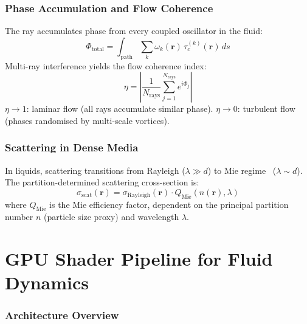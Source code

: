 \documentclass[twocolumn,10pt,a4paper]{article}
\theoremstyle{plain}
\theoremstyle{definition}
\theoremstyle{remark}
\newcommand{\tauc}{\tau_c}
\begin{document}
\section{Phase Accumulation and Flow Coherence}
\label{sec:coherence}

The ray accumulates phase from every coupled oscillator in the fluid:
\begin{equation}
    \Phi_{\mathrm{total}} = \int_{\mathrm{path}} \sum_k \omega_k(\mathbf{r})\, \tauc^{(k)}(\mathbf{r})\, ds
\end{equation}
Multi-ray interference yields the flow coherence index:
\begin{equation}
    \eta = \left|\frac{1}{N_{\mathrm{rays}}} \sum_{j=1}^{N_{\mathrm{rays}}} e^{i\Phi_j}\right|
\end{equation}
$\eta \to 1$: laminar flow (all rays accumulate similar phase). $\eta \to 0$: turbulent flow (phases randomised by multi-scale vortices).

\section{Scattering in Dense Media}
\label{sec:scattering}

In liquids, scattering transitions from Rayleigh ($\lambda \gg d$) to Mie regime~\cite{mie1908} ($\lambda \sim d$). The partition-determined scattering cross-section is:
\begin{equation}
    \sigma_{\mathrm{scat}}(\mathbf{r}) = \sigma_{\mathrm{Rayleigh}}(\mathbf{r}) \cdot Q_{\mathrm{Mie}}(n(\mathbf{r}), \lambda)
\end{equation}
where $Q_{\mathrm{Mie}}$ is the Mie efficiency factor, dependent on the principal partition number $n$ (particle size proxy) and wavelength $\lambda$.


\part{GPU Shader Pipeline for Fluid Dynamics}
\label{part:pipeline}

\section{Architecture Overview}
\label{sec:architecture}
\end{document}
